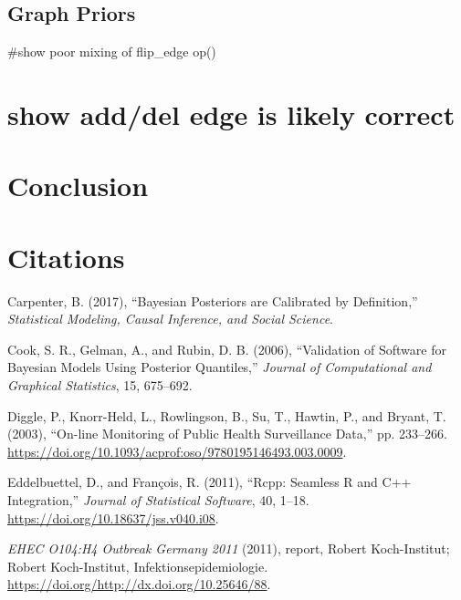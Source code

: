 \documentclass[11pt,a4paper]{article}
\numberwithin{equation}{section}
\begin{document}
\hypertarget{graph-priors}{%
\subsection{Graph Priors}\label{graph-priors}}

\#show poor mixing of flip\_edge op()

\hypertarget{show-adddel-edge-is-likely-correct}{%
\section{show add/del edge is likely
correct}\label{show-adddel-edge-is-likely-correct}}

\hypertarget{conclusion}{%
\section{Conclusion}\label{conclusion}}

\hypertarget{citations}{%
\section*{Citations}\label{citations}}

\hypertarget{refs}{}
\leavevmode\hypertarget{ref-carpenter_bayesian_2017}{}%
Carpenter, B. (2017), ``Bayesian Posteriors are Calibrated by
Definition,'' \emph{Statistical Modeling, Causal Inference, and Social
Science}.

\leavevmode\hypertarget{ref-cook_validation_2006}{}%
Cook, S. R., Gelman, A., and Rubin, D. B. (2006), ``Validation of
Software for Bayesian Models Using Posterior Quantiles,'' \emph{Journal
of Computational and Graphical Statistics}, 15, 675--692.

\leavevmode\hypertarget{ref-diggle_-line_2003}{}%
Diggle, P., Knorr-Held, L., Rowlingson, B., Su, T., Hawtin, P., and
Bryant, T. (2003), ``On-line Monitoring of Public Health Surveillance
Data,'' pp. 233--266.
\url{https://doi.org/10.1093/acprof:oso/9780195146493.003.0009}.

\leavevmode\hypertarget{ref-eddelbuettel_rcpp_2011}{}%
Eddelbuettel, D., and François, R. (2011), ``Rcpp: Seamless R and C++
Integration,'' \emph{Journal of Statistical Software}, 40, 1--18.
\url{https://doi.org/10.18637/jss.v040.i08}.

\leavevmode\hypertarget{ref-noauthor_ehec_2011}{}%
\emph{EHEC O104:H4 Outbreak Germany 2011} (2011), report, Robert
Koch-Institut; Robert Koch-Institut, Infektionsepidemiologie.
\url{https://doi.org/http://dx.doi.org/10.25646/88}.
\end{document}
